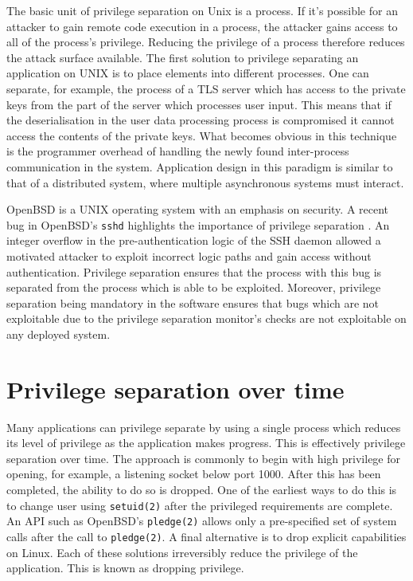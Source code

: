 \documentclass[a4paper,12pt,twoside,openright]{report}
\begin{document}
The basic unit of privilege separation on Unix is a process. If it's possible for an attacker to gain remote code execution in a process, the attacker gains access to all of the process's privilege. Reducing the privilege of a process therefore reduces the attack surface available. The first solution to privilege separating an application on UNIX is to place elements into different processes. One can separate, for example, the process of a TLS server which has access to the private keys from the part of the server which processes user input. This means that if the deserialisation in the user data processing process is compromised it cannot access the contents of the private keys. What becomes obvious in this technique is the programmer overhead of handling the newly found inter-process communication in the system. Application design in this paradigm is similar to that of a distributed system, where multiple asynchronous systems must interact.

OpenBSD is a UNIX operating system with an emphasis on security. A recent bug in OpenBSD's \texttt{sshd} highlights the importance of privilege separation \citep{the_openbsd_foundation_openssh_2022}. An integer overflow in the pre-authentication logic of the SSH daemon allowed a motivated attacker to exploit incorrect logic paths and gain access without authentication. Privilege separation ensures that the process with this bug is separated from the process which is able to be exploited. Moreover, privilege separation being mandatory in the software ensures that bugs which are not exploitable due to the privilege separation monitor's checks are not exploitable on any deployed system.

\section{Privilege separation over time}

Many applications can privilege separate by using a single process which reduces its level of privilege as the application makes progress. This is effectively privilege separation over time. The approach is commonly to begin with high privilege for opening, for example, a listening socket below port 1000. After this has been completed, the ability to do so is dropped. One of the earliest ways to do this is to change user using \texttt{setuid(2)} after the privileged requirements are complete. An API such as OpenBSD's \texttt{pledge(2)} allows only a pre-specified set of system calls after the call to \texttt{pledge(2)}. A final alternative is to drop explicit capabilities on Linux. Each of these solutions irreversibly reduce the privilege of the application. This is known as dropping privilege.
\end{document}
